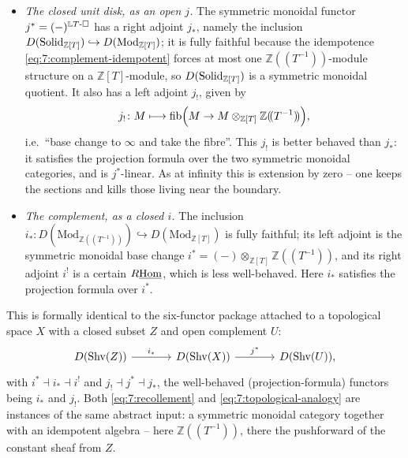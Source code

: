\begin{itemize}
\item \emph{The closed unit disk, as an open $j$.} The symmetric monoidal
functor $j^{*}=(-)^{\mathbb{L}T\text{-}\square}$ has a right adjoint $j_{*}$, namely the
inclusion $D(\mathrm{Solid}_{\mathbb{Z}[T]})\hookrightarrow
D(\mathrm{Mod}_{\mathbb{Z}[T]})$; it is fully faithful because the idempotence
\eqref{eq:7:complement-idempotent} forces at most one
$\mathbb{Z}(\!(T^{-1})\!)$-module structure on a $\mathbb{Z}[T]$-module, so
$D(\mathrm{Solid}_{\mathbb{Z}[T]})$ is a symmetric monoidal quotient. It also has a
left adjoint $j_{!}$, given by
\begin{equation*}
j_{!}\colon M\longmapsto\mathrm{fib}\Bigl(M\to M\otimes_{\mathbb{Z}[T]}
\mathbb{Z}(\!(T^{-1})\!)\Bigr),
\end{equation*}
i.e.\ ``base change to $\infty$ and take the fibre''. This $j_{!}$ is better
behaved than $j_{*}$: it satisfies the projection formula over the two
symmetric monoidal categories, and is $j^{*}$-linear. As at infinity this is
extension by zero -- one keeps the sections and kills those living near the
boundary.
\item \emph{The complement, as a closed $i$.} The inclusion
$i_{*}\colon D(\mathrm{Mod}_{\mathbb{Z}(\!(T^{-1})\!)})\hookrightarrow
D(\mathrm{Mod}_{\mathbb{Z}[T]})$ is fully faithful; its left adjoint is the
symmetric monoidal base change $i^{*}=(-)\otimes_{\mathbb{Z}[T]}
\mathbb{Z}(\!(T^{-1})\!)$, and its right adjoint $i^{!}$ is a certain
$R\underline{\operatorname{Hom}}$, which is less well-behaved. Here $i_{*}$ satisfies the projection
formula over $i^{*}$.
\end{itemize}

This is formally identical to the six-functor package attached to a
topological space $X$ with a closed subset $Z$ and open complement $U$:
\begin{equation}
\label{eq:7:topological-analogy}
\begin{tikzcd}[column sep=large]
D(\mathrm{Shv}(Z)) \arrow[r, "i_{*}"] & D(\mathrm{Shv}(X))
\arrow[r, "j^{*}"] & D(\mathrm{Shv}(U)),
\end{tikzcd}
\end{equation}
with $i^{*}\dashv i_{*}\dashv i^{!}$ and $j_{!}\dashv j^{*}\dashv j_{*}$, the
well-behaved (projection-formula) functors being $i_{*}$ and $j_{!}$. Both
\eqref{eq:7:recollement} and \eqref{eq:7:topological-analogy} are instances of
the same abstract input: a symmetric monoidal category together with an
idempotent algebra -- here $\mathbb{Z}(\!(T^{-1})\!)$, there the pushforward
of the constant sheaf from $Z$.

